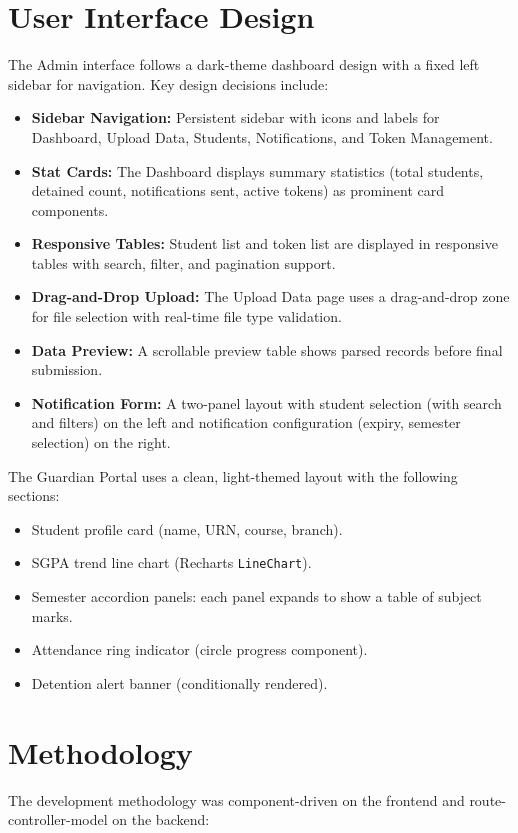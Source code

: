 \documentclass[12pt,a4paper]{report}
\begin{document}
\section{User Interface Design}
The Admin interface follows a dark-theme dashboard design with a fixed left sidebar for navigation. Key design decisions include:
\begin{itemize}
  \item \textbf{Sidebar Navigation:} Persistent sidebar with icons and labels for Dashboard, Upload Data, Students, Notifications, and Token Management.
  \item \textbf{Stat Cards:} The Dashboard displays summary statistics (total students, detained count, notifications sent, active tokens) as prominent card components.
  \item \textbf{Responsive Tables:} Student list and token list are displayed in responsive tables with search, filter, and pagination support.
  \item \textbf{Drag-and-Drop Upload:} The Upload Data page uses a drag-and-drop zone for file selection with real-time file type validation.
  \item \textbf{Data Preview:} A scrollable preview table shows parsed records before final submission.
  \item \textbf{Notification Form:} A two-panel layout with student selection (with search and filters) on the left and notification configuration (expiry, semester selection) on the right.
\end{itemize}

The Guardian Portal uses a clean, light-themed layout with the following sections:
\begin{itemize}
  \item Student profile card (name, URN, course, branch).
  \item SGPA trend line chart (Recharts \texttt{LineChart}).
  \item Semester accordion panels: each panel expands to show a table of subject marks.
  \item Attendance ring indicator (circle progress component).
  \item Detention alert banner (conditionally rendered).
\end{itemize}

\section{Methodology}
The development methodology was component-driven on the frontend and route-controller-model on the backend:
\end{document}
